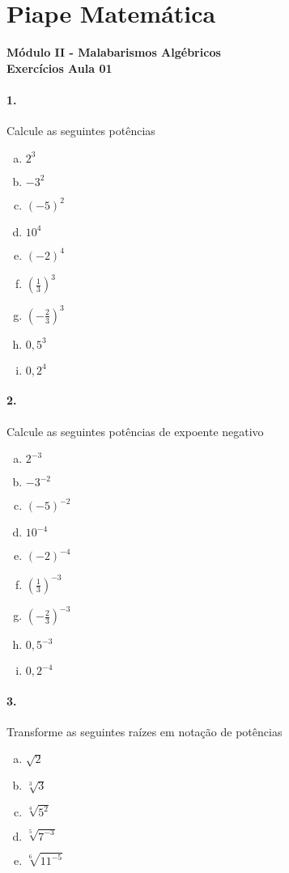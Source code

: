 \documentclass[a4paper,twocolumn,12pt]{article}
\begin{document}
 
  
\section*{Piape Matemática} 
\textbf{Módulo II - Malabarismos Algébricos}\\
\textbf{Exercícios Aula 01}         

\paragraph{1.} Calcule as seguintes potências
\begin{enumerate}[a)]
    \item $2^3$
    \item $-3^2$
    \item $(-5)^2$
    \item $10^4$
    \item $(-2)^4$
    \item $\left(\frac{1}{3}\right)^3$
    \item $\left(-\frac{2}{3}\right)^3$
    \item $0,\!5^3$
    \item $0,\!2^4$
\end{enumerate}

\paragraph*{2.} Calcule as seguintes potências de expoente negativo
\begin{enumerate}[a)]
    \item $2^{-3}$
    \item $-3^{-2}$
    \item $(-5)^{-2}$
    \item $10^{-4}$
    \item $(-2)^{-4}$
    \item $\left(\frac{1}{3}\right)^{-3}$
    \item $\left(-\frac{2}{3}\right)^{-3}$
    \item $0,\!5^{-3}$
    \item $0,\!2^{-4}$
\end{enumerate}

\newpage

\paragraph*{3.} Transforme as seguintes raízes em notação de potências
\begin{enumerate}[a)]
    \item $\sqrt{2}$
    \item $\sqrt[3]{3}$
    \item $\sqrt[4]{5^2}$
    \item $\sqrt[5]{7^{-3}}$
    \item $\sqrt[6]{11^{-5}}$
\end{enumerate}
\end{document}
